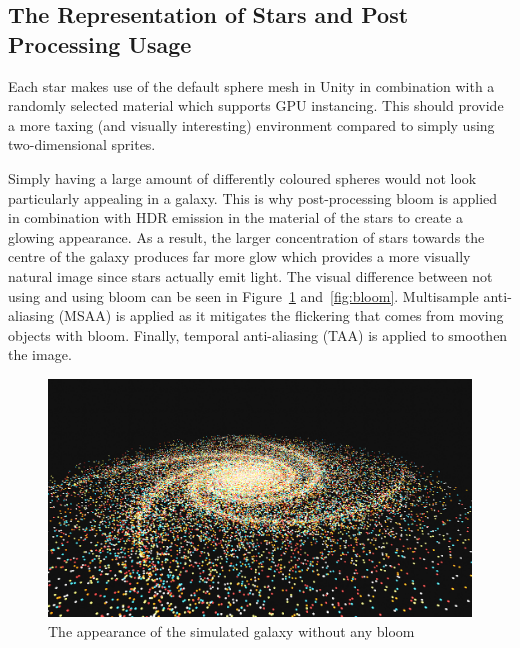 \subsection{The Representation of Stars and Post Processing Usage}
Each star makes use of the default sphere mesh in Unity in combination with a randomly selected material which supports GPU instancing. This should provide a more taxing (and visually interesting) environment compared to simply using two-dimensional sprites. 

Simply having a large amount of differently coloured spheres would not look particularly appealing in a galaxy. This is why post-processing bloom is applied in combination with HDR emission in the material of the stars to create a glowing appearance. As a result, the larger concentration of stars towards the centre of the galaxy produces far more glow which provides a more visually natural image since stars actually emit light. The visual difference between not using and using bloom can be seen in Figure~\ref{fig:nobloom} and~\ref{fig:bloom}.
Multisample anti-aliasing (MSAA) is applied as it mitigates the flickering that comes from moving objects with bloom. Finally, temporal anti-aliasing (TAA) is applied to smoothen the image. 

\begin{figure}[tbph]
    \centering
    \includegraphics[width=1\textwidth]{Figures/noBloom.png}
    \caption[Galaxy without bloom]{The appearance of the simulated galaxy without any bloom}
    \label{fig:nobloom}
\end{figure}

